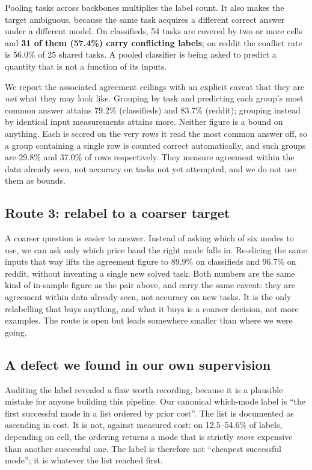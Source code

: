 Pooling tasks across backbones multiplies the label count. It also makes the
target ambiguous, because the same task acquires a different correct answer
under a different model. On classifieds, 54 tasks are covered by two or more cells and
\textbf{31 of them (57.4\%) carry conflicting labels}; on reddit the conflict
rate is 56.0\% of 25 shared tasks. A pooled classifier is being asked to predict
a quantity that is not a function of its inputs.

We report the associated agreement ceilings with an explicit caveat that they
are \emph{not} what they may look like. Grouping by task and predicting each
group's most common answer attains 79.2\% (classifieds) and 83.7\% (reddit);
grouping instead by identical input measurements attains more. Neither figure
is a bound on anything. Each is scored on the very rows it read the most
common answer off, so a group containing a single row is counted correct
automatically, and such groups are 29.8\% and 37.0\% of rows respectively.
They measure agreement within the data already seen, not accuracy on tasks not
yet attempted, and we do not use them as bounds.

\subsection{Route 3: relabel to a coarser target}

A coarser question is easier to answer. Instead of asking which of six modes
to use, we can ask only which price band the right mode falls in. Re-slicing
the same inputs that way lifts the agreement figure to 89.9\% on classifieds
and 96.7\% on reddit, without inventing a single new solved task. Both numbers
are the same kind of in-sample figure as the pair above, and carry the same
caveat: they are agreement within data already seen, not accuracy on new
tasks. It is the only relabelling that buys anything, and what it buys is a
coarser decision, not more examples. The
route is open but leads somewhere smaller than where we were going.


\subsection{A defect we found in our own supervision}

Auditing the label revealed a flaw worth recording, because it is a plausible
mistake for anyone building this pipeline. Our canonical which-mode label is
``the first successful mode in a list ordered by prior cost''. The list is
documented as ascending in cost. It is not, against measured cost: on
12.5--54.6\% of labels, depending on cell, the ordering returns a mode that is
strictly \emph{more} expensive than another successful one. The label is
therefore not ``cheapest successful mode''; it is whatever the list reached
first.

